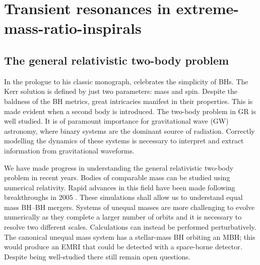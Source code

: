 \chapter{Transient resonances in extreme-mass-ratio-inspirals}\label{ch:resonances}

\section{The general relativistic two-body problem}

In the prologue to his classic monograph, \citet{Chandrasekhar1992} celebrates the simplicity of BHs. The Kerr solution is defined by just two parameters: mass and spin. Despite the baldness of the BH metrics, great intricacies manifest in their properties. This is made evident when a second body is introduced. The two-body problem in GR is well studied. It is of paramount importance for gravitational wave (GW) astronomy, where binary systems are the dominant source of radiation. Correctly modelling the dynamics of these systems is necessary to interpret and extract information from gravitational waveforms.

We have made progress in understanding the general relativistic two-body problem in recent years. Bodies of comparable mass can be studied using numerical relativity. Rapid advances in this field have been made following breakthroughs in 2005 \citep{Pretorius2005,Campanelli2006,Baker2006}. These simulations shall allow us to understand equal mass BH--BH mergers. %
Systems of unequal masses are more challenging to evolve numerically as they complete a larger number of orbits and it is necessary to resolve two different scales. Calculations can instead be performed perturbatively. The canonical unequal mass system has a stellar-mass BH orbiting an MBH; this would produce an EMRI that could be detected with a space-borne detector. %
Despite being well-studied there still remain open questions.

